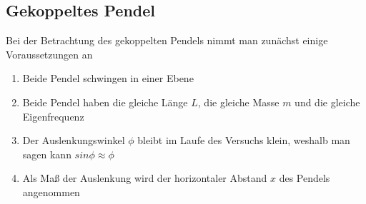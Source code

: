 \subsection{Gekoppeltes Pendel}
Bei der Betrachtung des gekoppelten Pendels nimmt man zunächst einige Voraussetzungen an
\begin{enumerate}
\item Beide Pendel schwingen in einer Ebene
\item Beide Pendel haben die gleiche Länge $L$, die gleiche Masse $m$ und die gleiche Eigenfrequenz
\item Der Auslenkungswinkel $\phi$ bleibt im Laufe des Versuchs klein, weshalb man  sagen kann $sin \phi \approx \phi$
\item Als Maß der Auslenkung wird der horizontaler Abstand $x$ des Pendels angenommen
\end{enumerate}

